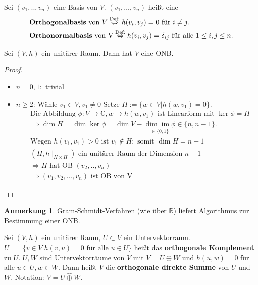 \documentclass[a4paper, titlepage]{article}
\theoremstyle{definition}
\newtheorem*{anm}{Anmerkung}
\newcommand{\R}{\mathbb{R}}
\newcommand{\C}{\mathbb{C}}
\begin{document}
\begin{definition}
	Sei $(v_1,..,v_n)$ eine Basis von $V$. $(v_1, \dots,v_n) $ heißt eine
	\begin{align*} &\text{\textbf{Orthogonalbasis} von } V \overset{\text{Def:}}{\Leftrightarrow} h(v_i,v_j) = 0 \text{ für } i \neq j.\\
		&\text{\textbf{Orthonormalbasis} von V}\overset{\text{Def:}}{\Leftrightarrow} h(v_i, v_j) = \delta_{ij} \text{ für alle } 1 \leq i,j \leq n.
	\end{align*}
\end{definition}
\begin{satz}
	Sei $(V,h)$ ein unitärer Raum. Dann hat $V$ eine ONB.
\end{satz}
\begin{proof}
	\begin{itemize}
	gzz.: $(V,h)$ hat eine OB (normieren der Basisvektoren liefert dann ONB)
	Beweis per Induktion nach $n = \operatorname{dim}(V)$.
	\item $n = 0,1: $ trivial
	\item	$n\geq 2$: Wähle $v_1 \in V, v_1 \neq 0$
	Setze $H:=\{ w \in V | h(w,v_1) =0\}.$ 
	\begin{align*}
	&\text{Die Abbildung } \phi: V \longrightarrow \C, w \mapsto h(w,v_1) \text{ ist Linearform mit } \operatorname{ker}\phi = H\\
	&\Rightarrow\operatorname{dim} H = \operatorname{dim} \operatorname{ker}\phi = \operatorname{dim} V - \underset{\in\{0,1\}}{\operatorname{dim}\operatorname{im}\phi} \in \{n,n-1\}.\\
	&\text{Wegen } h(v_1,v_1)>0 \text{ ist } v_1 \not\in H; \text{ somit } \operatorname{dim} H = n-1 \\
	& (H,h\mid_{H \times H}) \text{ ein unitärer Raum der Dimension } n-1\\
	&\Rightarrow H \text{ hat OB } (v_2,..,v_n)\\
	&\Rightarrow (v_1, v_2,...,v_n) \text{ ist OB von V}
	\end{align*}
	\end{itemize}
\end{proof}
\begin{anm}
 Gram-Schmidt-Verfahren (wie über $\R$) liefert Algorithmus zur Bestimmung einer ONB.
\end{anm}
 \begin{definition}
	Sei $(V,h)$ ein unitärer Raum, $U \subset V $ ein Untervektorraum.
	$U^{\bot} = \{ v \in V | h(v,u) = 0 \text{ für alle } u \in U\}$ heißt das \textbf{orthogonale Komplement} zu $U$.
	$U,W$ sind Untervektorräume von $V$ mit $V = U \oplus W$ und $h(u,w) = 0 $ für alle $ u \in U, w \in W.$
	Dann heißt $V$ die \textbf{orthogonale direkte Summe } von $U$ und $W.$
	Notation: $V=U \hat{\oplus} W.$
\end{definition}
\end{document}
